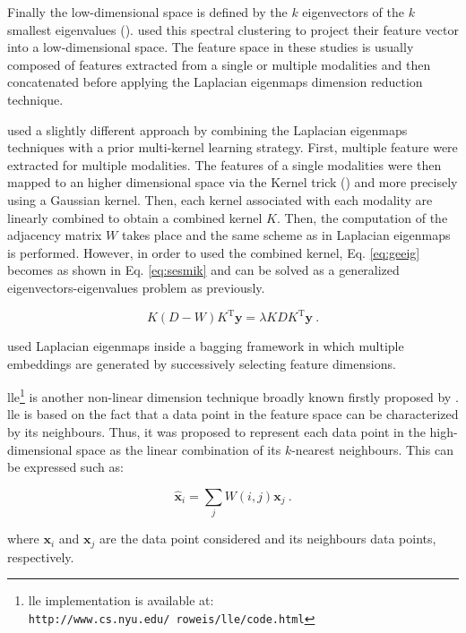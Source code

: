 Finally the low-dimensional space is defined by the $k$ eigenvectors of the $k$ smallest eigenvalues (\cite{Belkin2001}). \cite{Tiwari2007,Tiwari2009,Tiwari2009a,Viswanath2008} used this spectral clustering to project their feature vector into a low-dimensional space. The feature space in these studies is usually composed of features extracted from a single or multiple modalities and then concatenated before applying the Laplacian eigenmaps dimension reduction technique.

\cite{Tiwari2009,Tiwari2013} used a slightly different approach by combining the Laplacian eigenmaps techniques with a prior multi-kernel learning strategy. First, multiple feature were extracted for multiple modalities. The features of a single modalities were then mapped to an higher dimensional space via the Kernel trick (\cite{Aizerman1964}) and more precisely using a Gaussian kernel. Then, each kernel associated with each modality are linearly combined to obtain a combined kernel $K$. Then, the computation of the adjacency matrix $W$ takes place and the same scheme as in Laplacian eigenmaps is performed. However, in order to used the combined kernel, Eq. \ref{eq:geeig} becomes as shown in Eq. \ref{eq:sesmik} and can be solved as a generalized eigenvectors-eigenvalues problem as previously.

\begin{equation}
	K (D-W) K^{\text{T}} \mathbf{y} = \lambda K D K^{\text{T}} \mathbf{y} \ .
	\label{eq:sesmik}
\end{equation}

\cite{Viswanath2011} used Laplacian eigenmaps inside a bagging framework in which multiple embeddings are generated by successively selecting feature dimensions.

\ac{lle}\footnote{\ac{lle} implementation is available at: \texttt{http://www.cs.nyu.edu/\allowbreak ~roweis/lle/code.html}} is another non-linear dimension technique broadly known firstly proposed by \cite{Roweis2000}. \ac{lle} is based on the fact that a data point in the feature space can be characterized by its neighbours. Thus, it was proposed to represent each data point in the high-dimensional space as the linear combination of its $k$-nearest neighbours. This can be expressed such as:

\begin{equation}
	\hat{\mathbf{x}}_i = \sum_j W(i,j) \mathbf{x}_j \ .
	\label{eq:lincomlle}
\end{equation}

\noindent where $\mathbf{x}_i$ and $\mathbf{x}_j$ are the data point considered and its neighbours data points, respectively.

